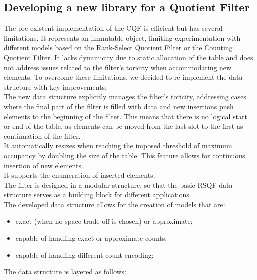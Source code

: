 \subsection{Developing a new library for a Quotient Filter}
The pre-existent implementation of the CQF is efficient but has several limitations. It represents an immutable object, limiting experimentation with different models based on the Rank-Select Quotient Filter or the Counting Quotient Filter. It lacks dynamicity due to static allocation of the table and does not address issues related to the filter's toricity when accommodating new elements.
To overcome these limitations, we decided to re-implement the data structure with key improvements.\\
The new data structure explicitly manages the filter's toricity, addressing cases where the final part of the filter is filled with data and new insertions push elements to the beginning of the filter. This means that there is no logical start or end of the table, as elements can be moved from the last slot to the first as continuation of the filter.\\
It automatically resizes when reaching the imposed threshold of maximum occupancy by doubling the size of the table. This feature allows for continuous insertion of new elements.\\
It supports the enumeration of inserted elements.\\
The filter is designed in a modular structure, so that the basic RSQF data structure serves as a building block for different applications.\\
The developed data structure allows for the creation of models that are:
\begin{itemize}
	\item exact (when no space trade-off is chosen) or approximate;
	\item capable of handling exact or approximate counts;
	\item capable of handling different count encoding;
\end{itemize}
The data structure is layered as follows:
